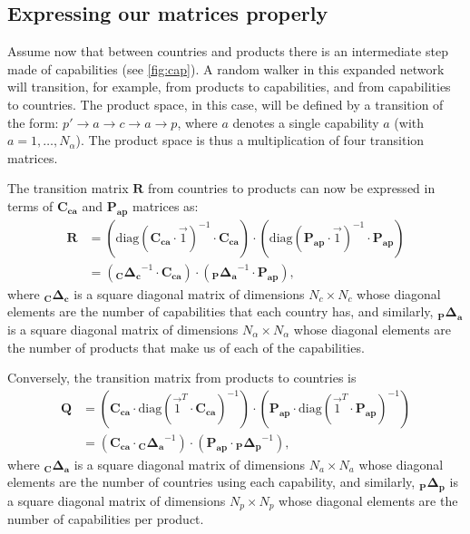 \documentclass[12pt]{article}
\newcommand{\mtx}[1]{\mathbf{ #1}}
\begin{document}
\subsection{Expressing our matrices properly}
Assume now that between countries and products there is an intermediate step made of capabilities (see \cref{fig:cap}). A random walker in this expanded network will transition, for example, from products to capabilities, and from capabilities to countries. The product space, in this case, will be defined by a transition of the form: $p'\rightarrow a\rightarrow c\rightarrow a \rightarrow p$, where $a$ denotes a single capability $a$ (with $a=1,\ldots, N_\alpha$). The product space is thus a multiplication of four transition matrices.

The transition matrix $\mtx{R}$ from countries to products can now be expressed in terms of $\mtx{C_{ca}}$ and $\mtx{P_{ap}}$ matrices as:
\begin{align}
	\mtx{R}&=\left( \text{diag}(\mtx{C_{ca}}\cdot\vec{1})^{-1}\cdot\mtx{C_{ca}} \right)\cdot\left( \text{diag}(\mtx{P_{ap}}\cdot\vec{1})^{-1}\cdot\mtx{P_{ap}} \right)\\
	&=\left( \mtx{{}_C\Delta_c}^{-1}\cdot\mtx{C_{ca}} \right)\cdot\left( \mtx{{}_P\Delta_a}^{-1}\cdot\mtx{P_{ap}} \right),
\end{align}
where $\mtx{{}_C\Delta_c}$ is a square diagonal matrix of dimensions $N_c\times N_c$ whose diagonal elements are the number of capabilities that each country has, and similarly, $\mtx{{}_P\Delta_a}$ is a square diagonal matrix of dimensions $N_\alpha\times N_\alpha$ whose diagonal elements are the number of products that make us of each of the capabilities.

Conversely, the transition matrix from products to countries is
\begin{align}
	\mtx{Q}&=\left( \mtx{C_{ca}}\cdot \text{diag}(\vec{1}^T\cdot\mtx{C_{ca}})^{-1} \right)\cdot\left( \mtx{P_{ap}}\cdot \text{diag}(\vec{1}^T\cdot\mtx{P_{ap}})^{-1} \right)\\
	&=\left( \mtx{C_{ca}}\cdot \mtx{{}_C\Delta_a}^{-1} \right)\cdot\left( \mtx{P_{ap}}\cdot \mtx{{}_P\Delta_p}^{-1} \right),
\end{align}
where $\mtx{{}_C\Delta_a}$ is a square diagonal matrix of dimensions $N_a\times N_a$ whose diagonal elements are the number of countries using each capability, and similarly, $\mtx{{}_P\Delta_p}$ is a square diagonal matrix of dimensions $N_p\times N_p$ whose diagonal elements are the number of capabilities per product.
\end{document}
